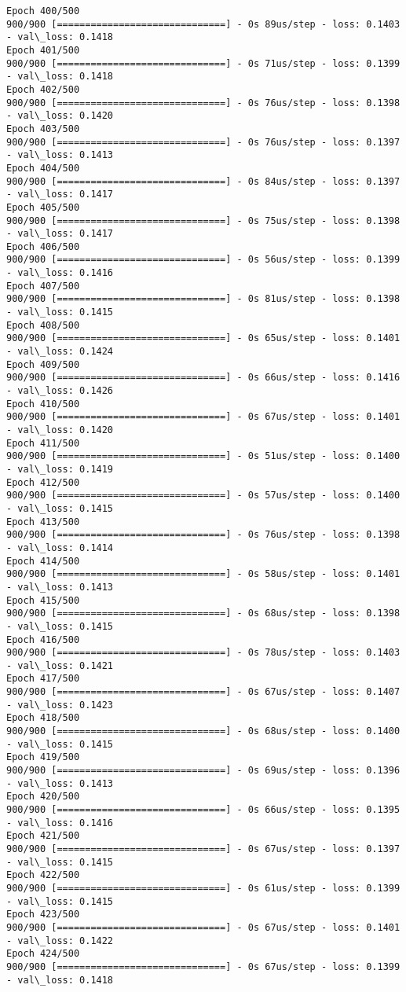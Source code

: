 \documentclass[11pt]{article}
\begin{document}
\begin{Verbatim}[commandchars=\\\{\}]
Epoch 400/500
900/900 [==============================] - 0s 89us/step - loss: 0.1403 - val\_loss: 0.1418
Epoch 401/500
900/900 [==============================] - 0s 71us/step - loss: 0.1399 - val\_loss: 0.1418
Epoch 402/500
900/900 [==============================] - 0s 76us/step - loss: 0.1398 - val\_loss: 0.1420
Epoch 403/500
900/900 [==============================] - 0s 76us/step - loss: 0.1397 - val\_loss: 0.1413
Epoch 404/500
900/900 [==============================] - 0s 84us/step - loss: 0.1397 - val\_loss: 0.1417
Epoch 405/500
900/900 [==============================] - 0s 75us/step - loss: 0.1398 - val\_loss: 0.1417
Epoch 406/500
900/900 [==============================] - 0s 56us/step - loss: 0.1399 - val\_loss: 0.1416
Epoch 407/500
900/900 [==============================] - 0s 81us/step - loss: 0.1398 - val\_loss: 0.1415
Epoch 408/500
900/900 [==============================] - 0s 65us/step - loss: 0.1401 - val\_loss: 0.1424
Epoch 409/500
900/900 [==============================] - 0s 66us/step - loss: 0.1416 - val\_loss: 0.1426
Epoch 410/500
900/900 [==============================] - 0s 67us/step - loss: 0.1401 - val\_loss: 0.1420
Epoch 411/500
900/900 [==============================] - 0s 51us/step - loss: 0.1400 - val\_loss: 0.1419
Epoch 412/500
900/900 [==============================] - 0s 57us/step - loss: 0.1400 - val\_loss: 0.1415
Epoch 413/500
900/900 [==============================] - 0s 76us/step - loss: 0.1398 - val\_loss: 0.1414
Epoch 414/500
900/900 [==============================] - 0s 58us/step - loss: 0.1401 - val\_loss: 0.1413
Epoch 415/500
900/900 [==============================] - 0s 68us/step - loss: 0.1398 - val\_loss: 0.1415
Epoch 416/500
900/900 [==============================] - 0s 78us/step - loss: 0.1403 - val\_loss: 0.1421
Epoch 417/500
900/900 [==============================] - 0s 67us/step - loss: 0.1407 - val\_loss: 0.1423
Epoch 418/500
900/900 [==============================] - 0s 68us/step - loss: 0.1400 - val\_loss: 0.1415
Epoch 419/500
900/900 [==============================] - 0s 69us/step - loss: 0.1396 - val\_loss: 0.1413
Epoch 420/500
900/900 [==============================] - 0s 66us/step - loss: 0.1395 - val\_loss: 0.1416
Epoch 421/500
900/900 [==============================] - 0s 67us/step - loss: 0.1397 - val\_loss: 0.1415
Epoch 422/500
900/900 [==============================] - 0s 61us/step - loss: 0.1399 - val\_loss: 0.1415
Epoch 423/500
900/900 [==============================] - 0s 67us/step - loss: 0.1401 - val\_loss: 0.1422
Epoch 424/500
900/900 [==============================] - 0s 67us/step - loss: 0.1399 - val\_loss: 0.1418

\end{Verbatim}
\end{document}
